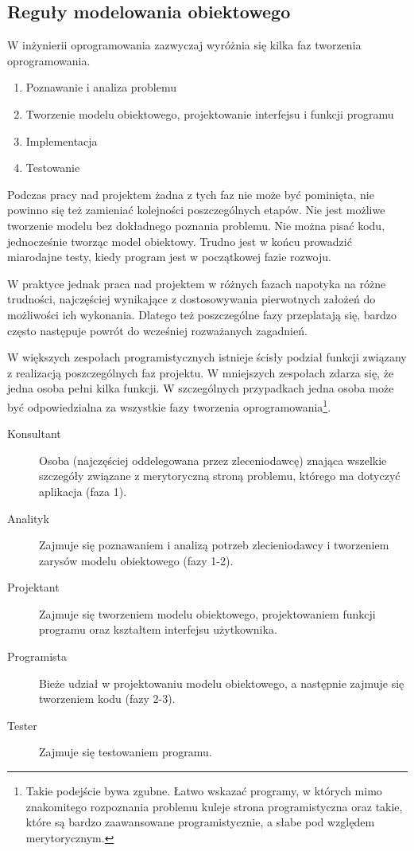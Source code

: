 \subsection{Reguły modelowania obiektowego}

W inżynierii oprogramowania zazwyczaj wyróżnia się kilka faz tworzenia oprogramowania. 

\begin{enumerate}
\item Poznawanie i analiza problemu
\item Tworzenie modelu obiektowego, projektowanie interfejsu i funkcji programu
\item Implementacja
\item Testowanie
\end{enumerate}

Podczas pracy nad projektem żadna z tych faz nie może być pominięta, nie powinno się też zamieniać
kolejności poszczególnych etapów. Nie jest możliwe tworzenie modelu bez dokładnego poznania problemu. 
Nie można pisać kodu, jednocześnie tworząc model obiektowy. Trudno jest w końcu prowadzić miarodajne testy,
kiedy program jest w początkowej fazie rozwoju.

W praktyce jednak praca nad projektem w różnych fazach napotyka na różne trudności, najczęściej wynikające
z dostosowywania pierwotnych założeń do możliwości ich wykonania. Dlatego też poszczególne fazy przeplatają się,
bardzo często następuje powrót do wcześniej rozważanych zagadnień.

W większych zespołach programistycznych istnieje ścisły podział funkcji związany z realizacją poszczególnych
faz projektu. W mniejszych zespołach zdarza się, że jedna osoba pełni kilka funkcji. W szczególnych przypadkach
jedna osoba może być odpowiedzialna za wszystkie fazy tworzenia 
oprogramowania\footnote{Takie podejście bywa zgubne. Łatwo wskazać programy, w których mimo znakomitego
rozpoznania problemu kuleje strona programistyczna oraz takie, które są bardzo zaawansowane programistycznie,
a słabe pod względem merytorycznym.}. 
\begin{description}
\item [Konsultant] Osoba (najczęściej oddelegowana przez zleceniodawcę) znająca wszelkie szczegóły związane
z merytoryczną stroną problemu, którego ma dotyczyć aplikacja (faza 1).
\item [Analityk] Zajmuje się poznawaniem i analizą potrzeb zlecieniodawcy i tworzeniem zarysów modelu
obiektowego (fazy 1-2).
\item [Projektant] Zajmuje się tworzeniem modelu obiektowego, projektowaniem funkcji programu oraz 
kształtem interfejsu użytkownika.
\item [Programista] Bieże udział w projektowaniu modelu obiektowego, a następnie zajmuje się tworzeniem 
kodu (fazy 2-3).
\item [Tester] Zajmuje się testowaniem programu.
\end{description}

